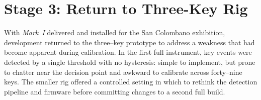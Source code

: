 
\section{Stage 3: Return to Three-Key Rig}\label{sec:ritornello}

With \emph{Mark~I} delivered and installed for the San Colombano exhibition, development returned to the three–key prototype to address a weakness that had become apparent during calibration.  
In the first full instrument, key events were detected by a single threshold with no hysteresis: simple to implement, but prone to chatter near the decision point and awkward to calibrate across forty–nine keys.  
The smaller rig offered a controlled setting in which to rethink the detection pipeline and firmware before committing changes to a second full build.


